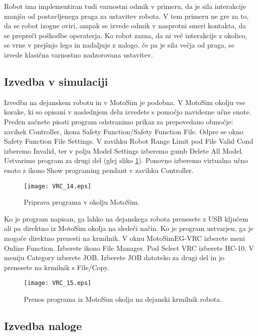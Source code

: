 Robot ima implementiran tudi varnostni odmik v primeru, da je sila interakcije manjša od postavljenega praga za ustavitev robota. V tem primeru ne gre za to, da se robot izogne oviri, ampak se izvede odmik v nasprotni smeri kontakta, da se prepreči poškodbe operaterja. Ko robot zazna, da ni več interakcije z okolico, se vrne v prejšnjo lego in nadaljuje z nalogo. če pa je sila večja od praga, se izvede klasična varnostno nadzorovana ustavitev.

\subsection{Izvedba v simulaciji} \label{sim2}

Izvedba na dejanskem robotu in v MotoSim je podobna. V MotoSim okolju vse korake, ki so opisani v naslednjem delu izvedete s pomočjo navidezne učne enote. Preden začnete pisati program odstranimo prikaz za prepovedano območje: zavihek Controller, ikona Safety Function/Safety Function File. Odpre se okno Safety Function File Settings. V zavihku Robot Range Limit pod File Valid Cond izberemo Invalid, ter v polju Model Settings izberemo gumb Delete All Model.
Ustvarimo program za drugi del (glej sliko \ref{fig:VRC_14}). Ponovno izberemo virtualno učno enoto z ikono Show programing pendant v zavihku Controller. 

\begin{figure}[hbt]
	\centering
	\texttt{[image: VRC\_14.eps]}
	\caption{Priprava programa v okolju MotoSim.}
	\label{fig:VRC_14}
\end{figure}

Ko je program napisan, ga lahko na dejanskega robota prenesete z USB ključem ali pa direktno iz MotoSim okolja na sledeči način. Ko je program ustvarjen, ga je mogoče direktno prenesti na krmilnik. V oknu MotoSimEG-VRC izberete meni Online Function. Izberete ikono File Manager. Pod Select VRC izberete HC-10. V meniju Category izberete JOB. Izberete JOB datoteko za drugi del in jo prenesete na krmilnik s File/Copy.

\begin{figure}[hbt]
	\centering
	\texttt{[image: VRC\_15.eps]}
	\caption{Prenos programa iz MotoSim okolja na dejanski krmilnik robota.}
	\label{fig:VRC_15}
\end{figure}

\subsection{Izvedba naloge} \label{realni2}


